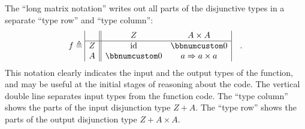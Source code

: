 The ``long matrix notation'' writes out all parts of the disjunctive
types in a separate ``type row'' and ``type column'':
\begin{equation}
f\triangleq\begin{array}{|c||cc|}
 & Z & A\times A\\
\hline Z & \text{id} & \bbnum 0\\
A & \bbnum 0 & a\Rightarrow a\times a
\end{array}\quad.
\end{equation}
This notation clearly indicates the input and the output types of
the function, and may be useful at the initial stages of reasoning
about the code. The vertical double line separates input types from
the function code. The ``type column'' shows the parts of the input
disjunction type $Z+A$. The ``type row'' shows the parts of the
output disjunction type $Z+A\times A$.

